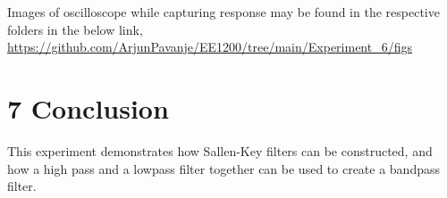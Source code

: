 \documentclass{article}
\begin{document}
Images of oscilloscope while capturing response may be found in the respective folders in the below link, \url{https://github.com/ArjunPavanje/EE1200/tree/main/Experiment_6/figs}


\section*{7 Conclusion}
This experiment demonstrates how Sallen-Key filters can be constructed, and how a high pass and a lowpass filter together can be used to create a bandpass filter.
\end{document}
